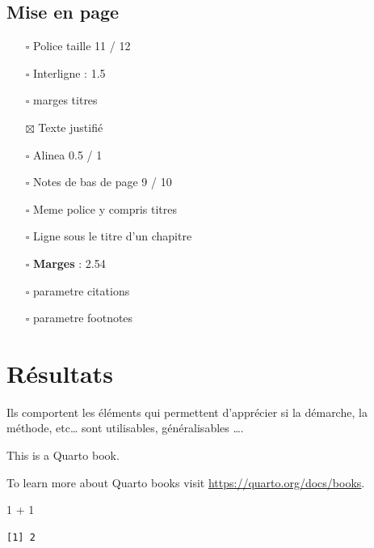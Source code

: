 \documentclass[
  a4paper,
]{scrbook}
\newenvironment{Shaded}{\begin{snugshade}}{\end{snugshade}}
\newcommand{\DecValTok}[1]{\textcolor[rgb]{0.16,0.63,0.60}{#1}}
\newcommand{\SpecialCharTok}[1]{\textcolor[rgb]{0.86,0.20,0.18}{#1}}
\begin{document}
\hypertarget{mise-en-page}{%
\section{Mise en page}\label{mise-en-page}}

\begin{itemize}
\item[$\square$]
  Police taille 11 / 12
\item[$\square$]
  Interligne : 1.5
\item[$\square$]
  marges titres
\item[$\boxtimes$]
  Texte justifié
\item[$\square$]
  Alinea 0.5 / 1
\item[$\square$]
  Notes de bas de page 9 / 10
\item[$\square$]
  Meme police y compris titres
\item[$\square$]
  Ligne sous le titre d'un chapitre
\item[$\square$]
  \textbf{Marges} : 2.54
\item[$\square$]
  parametre citations
\item[$\square$]
  parametre footnotes
\end{itemize}


\hypertarget{ruxe9sultats}{%
\chapter{Résultats}\label{ruxe9sultats}}

Ils comportent les éléments qui permettent d'apprécier si la démarche,
la méthode, etc\ldots{} sont utilisables, généralisables \ldots.

This is a Quarto book.

To learn more about Quarto books visit
\url{https://quarto.org/docs/books}.

\begin{Shaded}
\begin{Highlighting}[numbers=left,,]
\DecValTok{1} \SpecialCharTok{+} \DecValTok{1}
\end{Highlighting}
\end{Shaded}

\begin{verbatim}
[1] 2
\end{verbatim}
\end{document}
